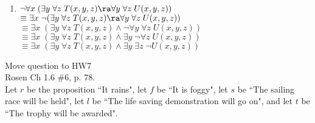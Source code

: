 \begin{questions}
\begin{solution}
\begin{enumerate}[label=(\alph*),itemsep=0pt,parsep=0pt,
        topsep=0pt,partopsep=0pt]
        \item $\neg \forall x\; (\exists y\; \forall z\; T(x,y,z) \ra \forall y\; \forall z\; U(x,y,z))$ \\
          $ \equiv \exists x\; \neg (\exists y\; \forall z\; T(x,y,z) \ra \forall y\; \forall z\; U(x,y,z))$ \\
          $ \equiv \exists x\; (\exists y\; \forall z\; T(x,y,z) \wedge \neg \forall y\; \forall z\; U(x,y,z))$ \\
          $ \equiv \exists x\; (\exists y\; \forall z\; T(x,y,z) \wedge \exists y\; \neg \forall z\; U(x,y,z))$ \\
          $ \equiv \exists x\; (\exists y\; \forall z\; T(x,y,z) \wedge \exists y\; \exists z\; \neg U(x,y,z))$ \\
      \end{enumerate}
  \end{solution}


 {\color{red} Move question to HW7} \\
Rosen Ch 1.6 \#6, p. 78.\\
Let $r$ be the proposition ``It rains", let $f$ be ``It is foggy",
    let $s$ be ``The sailing race will be held", let $l$ be ``The life
    saving demonstration will go on", and let $t$ be ``The trophy will
    be awarded".
    \ifprintanswers
        \vspace{-10pt}
    \fi


\end{questions}
